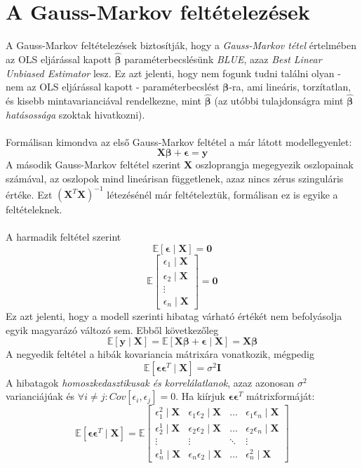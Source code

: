 \documentclass[14p]{report}
\def\pmb{\boldsymbol}
\def\ebeta{\hat{\pmb{\beta}}}
\def\e{\epsilon}
\newcounter{x}
\newcounter{y}
\newcounter{z}
\begin{document}
	\section{A Gauss-Markov feltételezések}
	A Gauss-Markov feltételezések biztosítják, hogy a \emph{Gauss-Markov tétel} értelmében az OLS eljárással kapott $\ebeta$ paraméterbecslésünk \emph{BLUE}, azaz \emph{Best Linear Unbiased Estimator} lesz. Ez azt jelenti, hogy nem fogunk tudni találni olyan - nem az OLS eljárással kapott - paraméterbecslést $\pmb{\beta}$-ra, ami lineáris, torzítatlan, és kisebb mintavarianciával rendelkezne, mint $\ebeta$ (az utóbbi tulajdonságra mint $\ebeta$ \emph{hatásossága} szoktak hivatkozni).
	\\
	\\ 
	Formálisan kimondva az első Gauss-Markov feltétel a már látott modellegyenlet:
	\[
	\pmb{X}\pmb{\beta} + \pmb{\e} = \pmb{y}
	\]
	A második Gauss-Markov feltétel szerint $\pmb{X}$ oszloprangja megegyezik oszlopainak számával, az oszlopok mind lineárisan függetlenek, azaz nincs zérus szinguláris értéke. Ezt $(\pmb{X}^T\pmb{X})^{-1}$ létezésénél már feltételeztük, formálisan ez is egyike a feltételeknek.
	\\
	\\
	A harmadik feltétel szerint
	\[
	\mathbb{E}[\pmb{\e} \mid \pmb{X}] = \pmb{0}
	\]
	\[
	\mathbb{E}
	\begin{bmatrix}
		\e_1 \mid \pmb{X} \\
		\e_2 \mid \pmb{X} \\
		\vdots \\
		\e_n \mid \pmb{X}
	\end{bmatrix}
	= \pmb{0}
	\]
	Ez azt jelenti, hogy a modell szerinti hibatag várható értékét nem befolyásolja egyik magyarázó változó sem. Ebből következőleg
	\[
	\mathbb{E}[\pmb{y} \mid \pmb{X}] = \mathbb{E}[\pmb{X}\pmb{\beta} + \pmb{\e} \mid \pmb{X}] = \pmb{X}\pmb{\beta}
	\]
	A negyedik feltétel a hibák kovariancia mátrixára vonatkozik, mégpedig
	\[
	\mathbb{E}[\pmb{\e}\pmb{\e}^T \mid \pmb{X}] = \sigma^2\pmb{I}
	\]
	A hibatagok \emph{homoszkedasztikusak és korrelálatlanok}, azaz azonosan $\sigma^2$ varianciájúak és $\forall i \ne j : Cov[\e_i, \e_j] = 0$. Ha kiírjuk $\pmb{\e}\pmb{\e}^T$ mátrixformáját:
	\[
	\mathbb{E}[\pmb{\e}\pmb{\e}^T \mid \pmb{X}] =
	\mathbb{E}
	\begin{bmatrix}
		\e_1^2 \mid \pmb{X} & \e_1 \e_2 \mid \pmb{X} & \dots & \e_1 \e_n \mid \pmb{X} \\
		\e_2^1 \mid \pmb{X} & \e_2 \e_2 \mid \pmb{X} & \dots & \e_2 \e_n \mid \pmb{X} \\
		\vdots & \vdots & \ddots & \vdots \\
		\e_n^1 \mid \pmb{X} & \e_n \e_2 \mid \pmb{X} & \dots & \e_n^2 \mid \pmb{X}
	\end{bmatrix}
	\]
\end{document}
